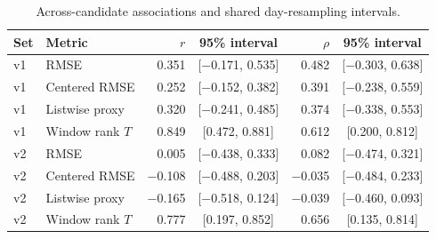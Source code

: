 \begin{table}[!htbp]
\centering\small
\caption{Across-candidate associations and shared day-resampling intervals.}\label{tab:corr}
\begin{tabularx}{\linewidth}{@{}lXrcrc@{}}
\toprule
Set & Metric & $r$ & 95\% interval & $\rho$ & 95\% interval \\
\midrule
v1 & RMSE & 0.351 & [$-$0.171, 0.535] & 0.482 & [$-$0.303, 0.638] \\
v1 & Centered RMSE & 0.252 & [$-$0.152, 0.382] & 0.391 & [$-$0.238, 0.559] \\
v1 & Listwise proxy & 0.320 & [$-$0.241, 0.485] & 0.374 & [$-$0.338, 0.553] \\
v1 & Window rank $T$ & 0.849 & [0.472, 0.881] & 0.612 & [0.200, 0.812] \\
v2 & RMSE & 0.005 & [$-$0.438, 0.333] & 0.082 & [$-$0.474, 0.321] \\
v2 & Centered RMSE & $-$0.108 & [$-$0.488, 0.203] & $-$0.035 & [$-$0.484, 0.233] \\
v2 & Listwise proxy & $-$0.165 & [$-$0.518, 0.124] & $-$0.039 & [$-$0.460, 0.093] \\
v2 & Window rank $T$ & 0.777 & [0.197, 0.852] & 0.656 & [0.135, 0.814] \\
\bottomrule
\end{tabularx}
\par\vspace{3pt}{\footnotesize $r$: Pearson; $\rho$: across-candidate Spearman. $T$ separately uses within-day Spearman. Percentile intervals: 7-day blocks, 10,000 replicates, dates resampled and candidates fixed. They exclude candidate-search and candidate-sampling uncertainty.}
\end{table}
